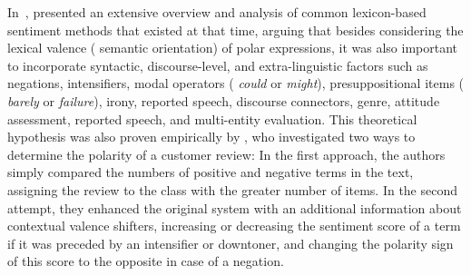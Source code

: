 

In~\citeyear{Polanyi:06}, \citeauthor{Polanyi:06} presented an
extensive overview and analysis of common lexicon-based sentiment
methods that existed at that time, arguing that besides considering
the lexical valence (\ie{} semantic orientation) of polar expressions,
it was also important to incorporate syntactic, discourse-level, and
extra-linguistic factors such as negations, intensifiers, modal
operators (\eg{} \emph{could} or \emph{might}), presuppositional items
(\eg{} \emph{barely} or \emph{failure}), irony, reported speech,
discourse connectors, genre, attitude assessment, reported speech, and
multi-entity evaluation.  This theoretical hypothesis was also proven
empirically by \citet{Kennedy:06}, who investigated two ways to
determine the polarity of a customer review: In the first approach,
the authors simply compared the numbers of positive and negative terms
in the text, assigning the review to the class with the greater number
of items.  In the second attempt, they enhanced the original system
with an additional information about contextual valence shifters,
increasing or decreasing the sentiment score of a term if it was
preceded by an intensifier or downtoner, and changing the polarity
sign of this score to the opposite in case of a negation.  %

